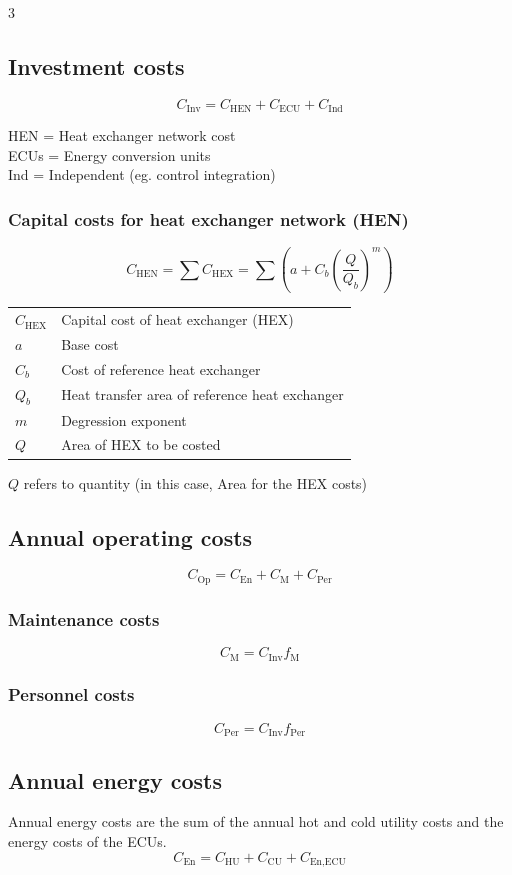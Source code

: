 \documentclass[9pt, landscape, a4paper]{article}
\begin{document}
\begin{multicols*}{3}
\subsection{Investment costs}
\[C_\text{Inv} = C_\text{HEN} + C_\text{ECU} + C_\text{Ind}\]

HEN = Heat exchanger network cost\\
ECUs = Energy conversion units\\
Ind = Independent (eg. control integration)

\subsubsection{Capital costs for heat exchanger network (HEN)}
\[C_\text{HEN} = \sum C_\text{HEX} = \sum\left(a + C_b\left(\dfrac{Q}{Q_b}\right)^m\right)\]

\begin{tabularx}{\linewidth}{@{}lX@{}}
  $C_\text{HEX}$ & Capital cost of heat exchanger (HEX) \\
  $a$ & Base cost \\
  $C_b$ & Cost of reference heat exchanger \\
  $Q_b$ & Heat transfer area of reference heat exchanger \\
  $m$ & Degression exponent \\
  $Q$ & Area of HEX to be costed
\end{tabularx}

$Q$ refers to quantity (in this case, Area for the HEX costs)

\subsection{Annual operating costs}
\[C_\text{Op} = C_\text{En} + C_\text{M} + C_\text{Per}\]

\subsubsection{Maintenance costs}
\[C_\text{M} = C_\text{Inv}f_\text{M}\]

\subsubsection{Personnel costs}
\[C_\text{Per} = C_\text{Inv}f_\text{Per}\]

\subsection{Annual energy costs}
Annual energy costs are the sum of the annual hot and cold utility costs and the energy costs of the ECUs.
\[C_\text{En} = C_\text{HU} + C_\text{CU} + C_{\text{En,ECU}}\]


\end{multicols*}
\end{document}
